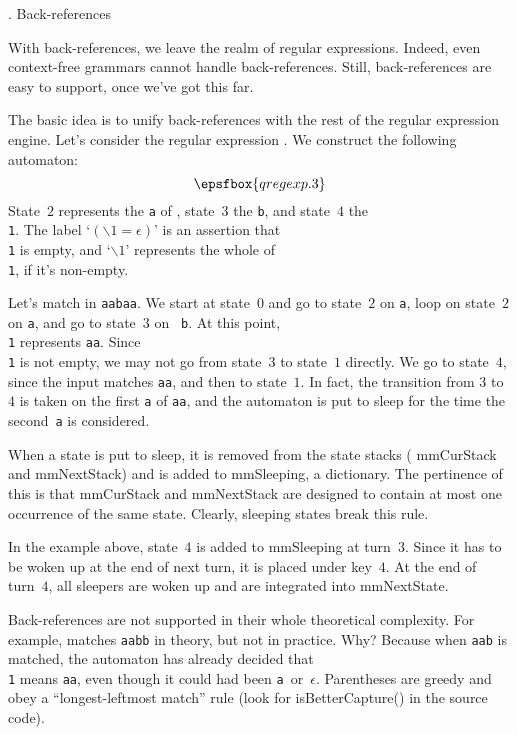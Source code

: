 . Back-references

With back-references, we leave the realm of regular expressions. Indeed, even
context-free grammars cannot handle back-references. Still, back-references are
easy to support, once we've got this far.

The basic idea is to unify back-references with the rest of the regular
expression engine. Let's consider the regular expression . We
construct the following automaton:
  $$\epsfbox{qregexp.3}$$
State~$2$ represents the {\tt a} of , state~$3$ the {\tt b}, and
state~$4$ the {\tt \\1}. The label `$(\backslash1 = \epsilon)$' is an assertion
that {\tt \\1} is empty, and `$\backslash1$' represents the whole of {\tt \\1},
if it's non-empty.

Let's match  in {\tt aabaa}. We start at state~$0$ and go to
state~$2$ on {\tt a}, loop on state~$2$ on {\tt a}, and go to state~$3$ on {\tt
b}. At this point, {\tt \\1} represents {\tt aa}. Since {\tt \\1} is not empty,
we may not go from state~$3$ to state~$1$ directly. We go to state~$4$, since
the input matches {\tt aa}, and then to state~$1$. In fact, the transition from
$3$ to $4$ is taken on the first {\tt a} of {\tt aa}, and the automaton is put
to sleep for the time the second~{\tt a} is considered.

When a state is put to sleep, it is removed from the state stacks ({\sf
mmCurStack} and {\sf mmNextStack}) and is added to {\sf mmSleeping}, a
dictionary. The pertinence of this is that {\sf mmCurStack} and {\sf
mmNextStack} are designed to contain at most one occurrence of the same state.
Clearly, sleeping states break this rule.

In the example above, state~$4$ is added to {\sf mmSleeping} at turn~$3$. Since
it has to be woken up at the end of next turn, it is placed under key~$4$. At
the end of turn~$4$, all sleepers are woken up and are integrated into {\sf
mmNextState}.

Back-references are not supported in their whole theoretical complexity. For
example,  matches {\tt aabb} in theory, but not in practice.
Why? Because when {\tt aab} is matched, the automaton has already decided that
{\tt \\1} means {\tt aa}, even though it could had been {\tt a}~or~$\epsilon$.
Parentheses are greedy and obey a ``longest-leftmost match'' rule (look for
{\sf isBetterCapture()} in the source code).

\bye
